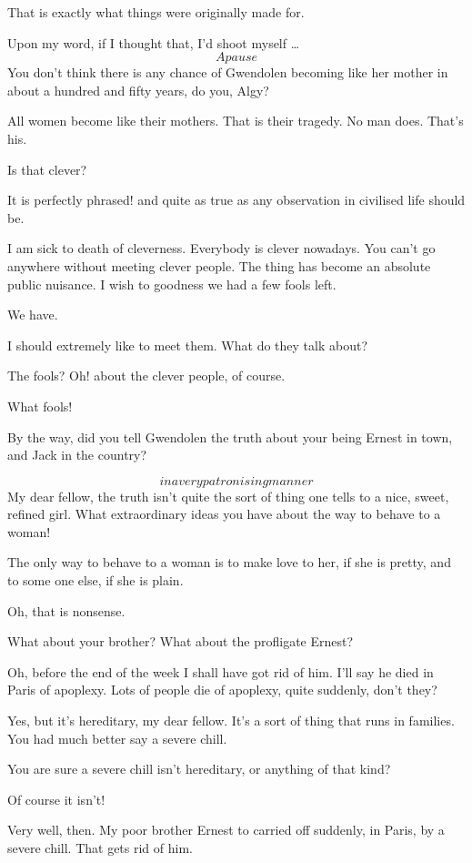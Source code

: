 \documentclass{book}
\begin{document}
\2  That is exactly what things were originally made for.

\1  Upon my word, if I thought that, I'd shoot myself \ldots{} \[A
pause\]  You don't think there is any chance of Gwendolen becoming
like her mother in about a hundred and fifty years, do you, Algy?

\2  All women become like their mothers.  That is their
tragedy.  No man does.  That's his.

\1  Is that clever?

\2  It is perfectly phrased! and quite as true as any
observation in civilised life should be.

\1  I am sick to death of cleverness.  Everybody is clever
nowadays.  You can't go anywhere without meeting clever people.
The thing has become an absolute public nuisance.  I wish to
goodness we had a few fools left.

\2  We have.

\1  I should extremely like to meet them.  What do they talk
about?

\2  The fools?  Oh! about the clever people, of course.

\1  What fools!

\2  By the way, did you tell Gwendolen the truth about your
being Ernest in town, and Jack in the country?

\1  \[in a very patronising manner\]  My dear fellow, the truth
isn't quite the sort of thing one tells to a nice, sweet, refined
girl.  What extraordinary ideas you have about the way to behave to
a woman!

\2  The only way to behave to a woman is to make love to
her, if she is pretty, and to some one else, if she is plain.

\1  Oh, that is nonsense.

\2  What about your brother?  What about the profligate
Ernest?

\1  Oh, before the end of the week I shall have got rid of him.
I'll say he died in Paris of apoplexy.  Lots of people die of
apoplexy, quite suddenly, don't they?

\2  Yes, but it's hereditary, my dear fellow.  It's a sort
of thing that runs in families.  You had much better say a severe
chill.

\1  You are sure a severe chill isn't hereditary, or anything of
that kind?

\2  Of course it isn't!

\1  Very well, then.  My poor brother Ernest to carried off
suddenly, in Paris, by a severe chill.  That gets rid of him.
\end{document}
